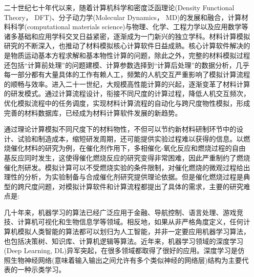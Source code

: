 二十世纪七十年代以来，随着计算机科学和密度泛函理论\textrm{(Density Functional Theory， DFT)}、分子动力学\textrm{(Molecular Dynamics， MD)}的发展和融合，计算材料科学\textrm{(computational materials science)}与物理、化学、工程力学以及应用数学等诸多基础和应用学科交叉日益紧密，逐渐成为一门新兴的独立学科。材料计算模拟研究的不断深入，也推动了材料模拟核心计算软件日益成熟。核心计算软件解决的是物质运动基本方程求解和基本物性计算的问题，除此之外，完整的材料模拟过程还包括“计算前处理”的问题建模、计算参数选择到“计算后处理”的数据分析，几乎每一部分都有大量具体的工作有赖人工，频繁的人机交互严重影响了模拟计算流程的顺畅与效率。进入二十一世纪，大规模高性能计算的兴起，逐渐变革了材料计算的研发模式。通过计算流程设计，衔接不同尺度的计算过程，降低人机交互频次，优化模拟流程中的任务调度，实现材料计算流程的自动化与跨尺度物性模拟，形成完善的材料数据库，已经成为材料计算软件发展的新趋势。

通过理论计算模拟不同尺度下的材料物性，不但可以节约新材料研制环节中的设计、试验和制造成本，缩短研发周期，还可能提供实验过程难以获得的信息。以燃烧催化材料的研究为例，在催化剂作用下，多相催化-氧化反应和燃烧过程的自由基反应同时发生，这使得催化燃烧反应的研究变得非常困难，因此严重制约了燃烧催化剂研发。模拟计算可以不受燃烧实验的条件限制，对催化燃烧的微观过程给出理性的分析，为实验制备与合成催化剂研究提供理论依据。但是催化燃烧过程是典型的跨尺度问题，对模拟计算软件和计算流程都提出了具体的需求，主要的研究难点是:




几十年来，机器学习的算法已经广泛应用于金融、导航控制、语言处理、游戏竞技、计算机可视化和生物信息学等领域。相反地，如果从非严格角度定义，任何计算机模拟人类智能的算法都可以划归为人工智能，并非一定要应用机器学习算法，也包括决策树、知识库、计算机逻辑等算法。近年来，机器学习领域的深度学习\textrm{(Deep Learning, DL)}异军突起，在很多领域都取得了很好的应用。深度学习是仿照生物神经网络(意味着输入输出之间允许有多个类似神经的网络层)结构为主要代表的一种示类学习。
